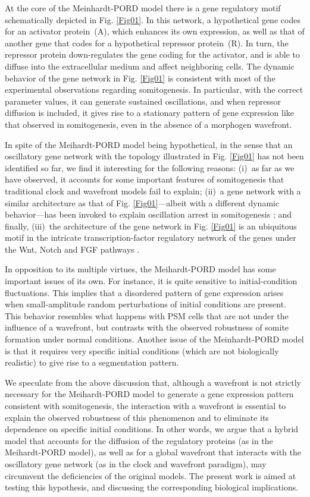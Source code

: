 \documentclass[%
 preprint,
 aip, 
 amsmath,amssymb,
]{revtex4-2}
\begin{document}
At the core of the Meinhardt-PORD model there is a gene regulatory motif schematically depicted in Fig. \ref{Fig01}. In this network, a hypothetical gene codes for an activator protein~(A), which enhances its own expression, as well as that of another gene that codes for a hypothetical repressor protein~(R). In turn, the repressor protein down-regulates the gene coding for the activator, and is able to diffuse into the extracellular medium and affect neighboring cells. The dynamic behavior of the gene network in Fig. \ref{Fig01} is consistent with most of the experimental observations regarding somitogenesis. In particular, with the correct parameter values, it can generate sustained oscillations, and when repressor diffusion is included, it gives rise to a stationary pattern of gene expression like that observed in somitogenesis, even in the absence of a morphogen wavefront.
	
In spite of the Meihardt-PORD model being hypothetical, in the sense that an oscillatory gene network with the topology illustrated in Fig. \ref{Fig01} has not been identified so far, we find it interesting for the following reasons: (i)~as far as we have observed, it accounts for some important features of somitogenesis that traditional clock and wavefront models fail to explain; (ii)~a gene network with a similar architecture as that of Fig. \ref{Fig01}---albeit with a different dynamic behavior---has been invoked to explain oscillation arrest in somitogenesis \cite{Santillan2008, Zavala2012}; and finally, (iii)~the architecture of the gene network in Fig. \ref{Fig01} is an ubiquitous motif in the intricate transcription-factor regulatory network of the genes under the Wnt, Notch and FGF pathways \cite{Gibb2010, Zavala2012}.
	
In opposition to its multiple virtues, the Meihardt-PORD model has some important issues of its own. For instance, it is quite sensitive to initial-condition fluctuations. This implies that a disordered pattern of gene expression arises when small-amplitude random perturbations of initial conditions are present. This behavior resembles what happens with PSM cells that are not under the influence of a wavefront, but contrasts with the observed robustness of somite formation under normal conditions. Another issue of the Meinhardt-PORD model is that it requires very specific initial conditions (which are not biologically realistic) to give rise to a segmentation pattern. 

We speculate from the above discussion that, although a wavefront is not strictly necessary for the Meihardt-PORD model to generate a gene expression pattern consistent with somitogenesis, the interaction with a wavefront is essential to explain the observed robustness of this phenomenon and to eliminate its dependence on specific initial conditions. In other words, we argue that a hybrid model that accounts for the diffusion of the regulatory proteins (as in the Meihardt-PORD model), as well as for a global wavefront that interacts with the oscillatory gene network (as in the clock and wavefront paradigm), may circumvent the deficiencies of the original models. The present work is aimed at testing this hypothesis, and discussing the corresponding biological implications.
	
\end{document}
